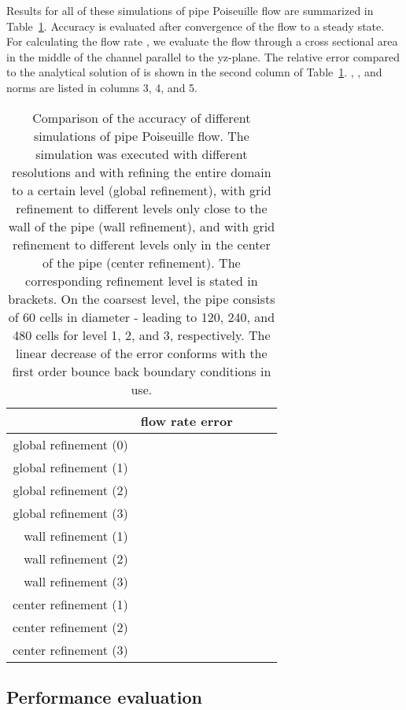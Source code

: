 \documentclass[final,leqno,onefignum,onetabnum]{siamltex1213}
\begin{document}
Results for all of these simulations of pipe Poiseuille flow are summarized in Table~\ref{fig:poiseuillen_table}.
Accuracy is evaluated after convergence of the flow to a steady state.
For calculating the flow rate , we evaluate the flow through a cross sectional area in the middle of the channel parallel to the yz-plane.
The relative error compared to the analytical solution of  is shown in the second column of Table~\ref{fig:poiseuillen_table}.
, , and  norms are listed in columns 3, 4, and 5.

\begin{table}[tbp]
  \centering
  \footnotesize
  \caption{Comparison of the accuracy of different simulations of pipe Poiseuille flow.
The simulation was executed with different resolutions and with refining the entire domain to a certain level (global refinement),
with grid refinement to different levels only close to the wall of the pipe (wall refinement),
and with grid refinement to different levels only in the center of the pipe (center refinement).
The corresponding refinement level is stated in brackets.
On the coarsest level, the pipe consists of 60 cells in diameter - leading to 120, 240, and 480 cells for level 1, 2, and 3, respectively.
The linear decrease of the error conforms with the first order bounce back boundary conditions in use.}
  \label{fig:poiseuillen_table}
  \begin{tabular}{rcccc}
  \toprule
  & flow rate error &  &  &  \\
  \midrule
  global refinement (0) &  &  &  &  \\
  global refinement (1) &  &  &  &  \\
  global refinement (2) &  &  &  &  \\
  global refinement (3) &  &  &  &  \\
  \midrule
  wall refinement (1) &  &  &  &  \\
  wall refinement (2) &  &  &  &  \\
  wall refinement (3) &  &  &  &  \\
  \midrule
  center refinement (1) &  &  &  &  \\
  center refinement (2) &  &  &  &  \\
  center refinement (3) &  &  &  &  \\
  \bottomrule
  \end{tabular}
\end{table}

\subsection{Performance evaluation}\label{sec:benchmarks:hpc}
\end{document}
